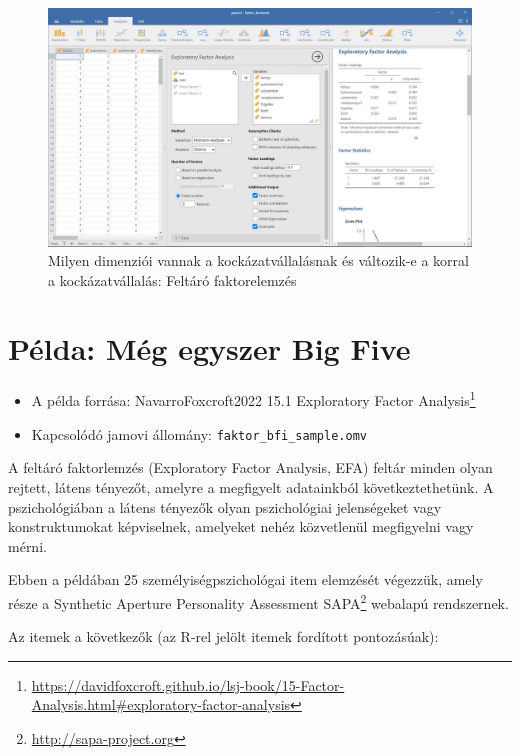 \documentclass[
  letterpaper,
]{krantz}
\providecommand{\tightlist}{%
  \setlength{\itemsep}{0pt}\setlength{\parskip}{0pt}}\usepackage{longtable,booktabs,array}
\renewcommand{\href}[2]{#2\footnote{\url{#1}}}
\begin{document}
\begin{figure}

{\centering \includegraphics{./images/faktor_kockazat_kep_01.jpg}

}

\caption{Milyen dimenziói vannak a kockázatvállalásnak és változik-e a
korral a kockázatvállalás: Feltáró faktorelemzés}

\end{figure}

\hypertarget{sec-bf2}{%
\section{Példa: Még egyszer Big Five}\label{sec-bf2}}

\begin{itemize}
\tightlist
\item
  A példa forrása: NavarroFoxcroft2022
  \href{https://davidfoxcroft.github.io/lsj-book/15-Factor-Analysis.html\#exploratory-factor-analysis}{15.1
  Exploratory Factor Analysis}
\item
  Kapcsolódó jamovi állomány: \texttt{faktor\_bfi\_sample.omv}
\end{itemize}

A feltáró faktorlemzés (Exploratory Factor Analysis, EFA) feltár minden
olyan rejtett, látens tényezőt, amelyre a megfigyelt adatainkból
következtethetünk. A pszichológiában a látens tényezők olyan
pszichológiai jelenségeket vagy konstruktumokat képviselnek, amelyeket
nehéz közvetlenül megfigyelni vagy mérni.

Ebben a példában 25 személyiségpszichológai item elemzését végezzük,
amely része a Synthetic Aperture Personality Assessment
\href{http://sapa-project.org}{SAPA} webalapú rendszernek.

Az itemek a következők (az R-rel jelölt itemek fordított pontozásúak):
\end{document}
